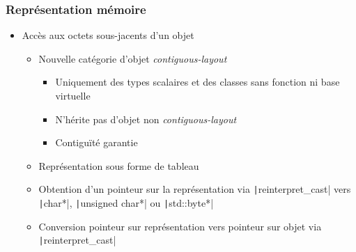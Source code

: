 \documentclass[C++.tex]{subfiles}
\begin{document}
\begin{frame}[fragile]
	\frametitle{Représentation mémoire}
	\begin{itemize}
		\item Accès aux octets sous-jacents d'un objet
		\begin{itemize}
			\item Nouvelle catégorie d'objet \textit{contiguous-layout}
			\begin{itemize}
				\item Uniquement des types scalaires et des classes sans fonction ni base virtuelle
				\item N'hérite pas d'objet non \textit{contiguous-layout}
				\item Contiguïté garantie
			\end{itemize}
			\item Représentation sous forme de tableau
			\item Obtention d'un pointeur sur la représentation via \texttt|reinterpret_cast| vers \texttt|char*|, \texttt|unsigned char*| ou \texttt|std::byte*|
			\item Conversion pointeur sur représentation vers pointeur sur objet via \texttt|reinterpret_cast|
		\end{itemize}
	\end{itemize}
\end{frame}
\end{document}
